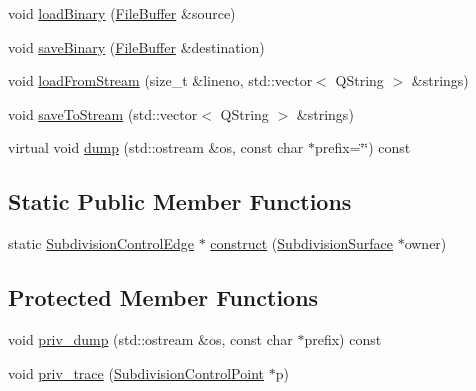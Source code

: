 \begin{DoxyCompactItemize}
\item 
void \hyperlink{classShipCADGeometry_1_1SubdivisionControlEdge_a0f48c4ce176a5de42e0a7c741aa129f5}{load\-Binary} (\hyperlink{classShipCADGeometry_1_1FileBuffer}{File\-Buffer} \&source)
\item 
void \hyperlink{classShipCADGeometry_1_1SubdivisionControlEdge_a572f4331ef0ab6f241583fc8d36cb93e}{save\-Binary} (\hyperlink{classShipCADGeometry_1_1FileBuffer}{File\-Buffer} \&destination)
\item 
void \hyperlink{classShipCADGeometry_1_1SubdivisionControlEdge_a7c6098254d4a92c44d01c3e247b29782}{load\-From\-Stream} (size\-\_\-t \&lineno, std\-::vector$<$ Q\-String $>$ \&strings)
\item 
void \hyperlink{classShipCADGeometry_1_1SubdivisionControlEdge_a21c0e8b4d4cd138ddd0bbcc707775040}{save\-To\-Stream} (std\-::vector$<$ Q\-String $>$ \&strings)
\item 
virtual void \hyperlink{classShipCADGeometry_1_1SubdivisionControlEdge_abdfa96ff05eff404214a92d38d7eb715}{dump} (std\-::ostream \&os, const char $\ast$prefix=\char`\"{}\char`\"{}) const 
\end{DoxyCompactItemize}
\subsection*{Static Public Member Functions}
\begin{DoxyCompactItemize}
\item 
static \hyperlink{classShipCADGeometry_1_1SubdivisionControlEdge}{Subdivision\-Control\-Edge} $\ast$ \hyperlink{classShipCADGeometry_1_1SubdivisionControlEdge_a20fc507b201766b6e3d0560595946fac}{construct} (\hyperlink{classShipCADGeometry_1_1SubdivisionSurface}{Subdivision\-Surface} $\ast$owner)
\end{DoxyCompactItemize}
\subsection*{Protected Member Functions}
\begin{DoxyCompactItemize}
\item 
void \hyperlink{classShipCADGeometry_1_1SubdivisionControlEdge_acc4cee57db50beb1dcc6361f7f2c62af}{priv\-\_\-dump} (std\-::ostream \&os, const char $\ast$prefix) const 
\item 
void \hyperlink{classShipCADGeometry_1_1SubdivisionControlEdge_aec6ff8caa6996ae5a9d2e58d5d2b0344}{priv\-\_\-trace} (\hyperlink{classShipCADGeometry_1_1SubdivisionControlPoint}{Subdivision\-Control\-Point} $\ast$p)
\end{DoxyCompactItemize}
